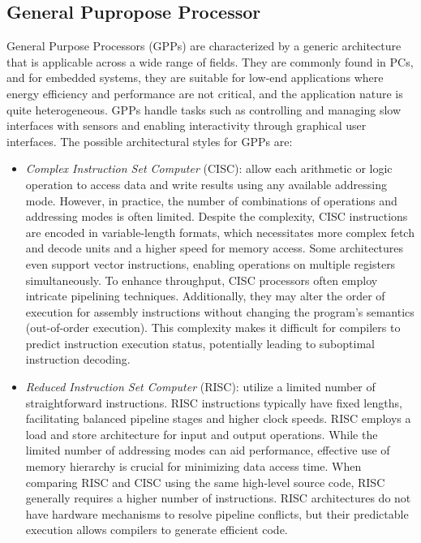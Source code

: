 \subsection{General Pupropose Processor}
General Purpose Processors (GPPs) are characterized by a generic architecture that is applicable across a wide range of fields. 
They are commonly found in PCs, and for embedded systems, they are suitable for low-end applications where energy efficiency and performance are not critical, and the application nature is quite heterogeneous.
GPPs handle tasks such as controlling and managing slow interfaces with sensors and enabling interactivity through graphical user interfaces.
The possible architectural styles for GPPs are: 
\begin{itemize}
    \item \textit{Complex Instruction Set Computer} (CISC): allow each arithmetic or logic operation to access data and write results using any available addressing mode. 
        However, in practice, the number of combinations of operations and addressing modes is often limited.
        Despite the complexity, CISC instructions are encoded in variable-length formats, which necessitates more complex fetch and decode units and a higher speed for memory access.
        Some architectures even support vector instructions, enabling operations on multiple registers simultaneously. 
        To enhance throughput, CISC processors often employ intricate pipelining techniques. 
        Additionally, they may alter the order of execution for assembly instructions without changing the program's semantics (out-of-order execution). 
        This complexity makes it difficult for compilers to predict instruction execution status, potentially leading to suboptimal instruction decoding. 
    \item \textit{Reduced Instruction Set Computer} (RISC): utilize a limited number of straightforward instructions. 
        RISC instructions typically have fixed lengths, facilitating balanced pipeline stages and higher clock speeds. 
        RISC employs a load and store architecture for input and output operations. 
        While the limited number of addressing modes can aid performance, effective use of memory hierarchy is crucial for minimizing data access time.
        When comparing RISC and CISC using the same high-level source code, RISC generally requires a higher number of instructions. 
        RISC architectures do not have hardware mechanisms to resolve pipeline conflicts, but their predictable execution allows compilers to generate efficient code. 

\end{itemize}
